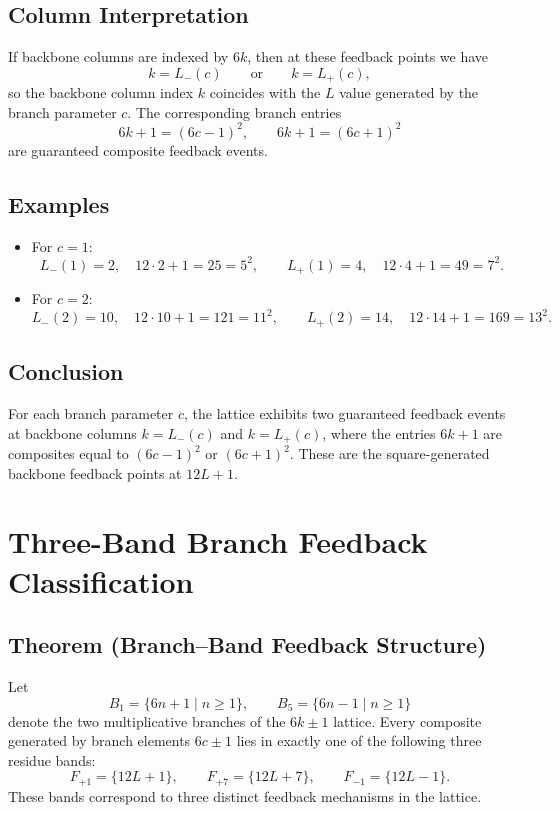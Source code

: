 \documentclass[12pt]{article}
\begin{document}
\subsection*{Column Interpretation}
If backbone columns are indexed by $6k$, then at these feedback points we
have
\[
k = L_-(c) \qquad \text{or} \qquad k = L_+(c),
\]
so the backbone column index $k$ coincides with the $L$ value generated by
the branch parameter $c$. The corresponding branch entries
\[
6k+1 = (6c-1)^2, \qquad 6k+1 = (6c+1)^2
\]
are guaranteed composite feedback events.

\subsection*{Examples}
\begin{itemize}
\item For $c=1$:
\[
L_-(1) = 2, \quad 12\cdot 2+1 = 25 = 5^2, \qquad
L_+(1) = 4, \quad 12\cdot 4+1 = 49 = 7^2.
\]
\item For $c=2$:
\[
L_-(2) = 10, \quad 12\cdot 10+1 = 121 = 11^2, \qquad
L_+(2) = 14, \quad 12\cdot 14+1 = 169 = 13^2.
\]
\end{itemize}

\subsection*{Conclusion}
For each branch parameter $c$, the lattice exhibits two guaranteed feedback
events at backbone columns $k = L_-(c)$ and $k = L_+(c)$, where the entries
$6k+1$ are composites equal to $(6c-1)^2$ or $(6c+1)^2$. These are the
square-generated backbone feedback points at $12L+1$.

\section{Three-Band Branch Feedback Classification}

\subsection*{Theorem (Branch--Band Feedback Structure)}
Let
\[
B_1 = \{6n+1 \mid n\ge 1\}, \qquad
B_5 = \{6n-1 \mid n\ge 1\}
\]
denote the two multiplicative branches of the $6k\pm 1$ lattice.
Every composite generated by branch elements $6c\pm 1$ lies in exactly one of
the following three residue bands:
\[
F_{+1} = \{12L+1\}, \qquad
F_{+7} = \{12L+7\}, \qquad
F_{-1} = \{12L-1\}.
\]
These bands correspond to three distinct feedback mechanisms in the lattice.
\end{document}
